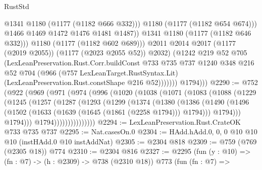 \begin{lexlean}{RustStd}
\begin{coremodule}
{\begin{coremodule}
{{{{{                              @1341
                              @1180
                              (@1177 (@1182 @666 @332)))
                            @1180
                            (@1177 (@1182 @654 @674)))
                          @1466
                          @1469
                          @1472
                          @1476
                          @1481
                          @1487))
                      @1341
                      @1180
                      (@1177 (@1182 @646 @332)))
                    @1180
                    (@1177 (@1182 @602 @689)))
                  @2011
                  @2014
                  @2017
                  (@1177 (@2019 @2055))
                  (@1177 (@2023 @2055 @52))
                  @2032)
                (@1242
                  @219
                  @52
                  @705
                  (LexLeanPreservation.Rust.Corr.buildConst
                    @733
                    @735
                    @737
                    @1240
                    @348
                    @216
                    @52
                    @704
                    (@966
                      (@757 LexLeanTarget.RustSyntax.Lit)
                      (LexLeanPreservation.Rust.constShape @216 @52)))))))
          @1794)))
@2290 := @752
    (@922
      (@969
        (@971
          (@974
            (@996
              (@1020
                (@1038
                  (@1071
                    (@1083
                      (@1088
                        (@1229
                          (@1245
                            (@1257
                              (@1287
                                (@1293
                                  (@1299
                                    (@1374
                                      (@1380
                                        (@1386
                                          (@1490
                                            (@1496
                                              (@1502
                                                (@1633 (@1639 (@1645 (@1861 (@2258 @1794))) @1794)))
                                              @1794)))
                                        @1794)))
                                  @1794)))))))))))))))
@2294 := LexLeanPreservation.Rust.CrateOK @733 @735 @737
@2295 := Nat.casesOn.{0}
@2304 := HAdd.hAdd.{0, 0, 0} @10 @10 @10 (instHAdd.{0} @10 instAddNat)
@2305 := @2304 @818
@2309 := @759 (@769 (@2305 @18)) @774
@2310 := @2304 @816
@2327 := @2295
    (fun (y : @10) => (fn : @7) -> (h : @2309) -> @738 (@2310 @18))
    @773
    (fun (fn : @7) =>
}}}}}
\end{coremodule}}
\end{coremodule}
\end{lexlean}
